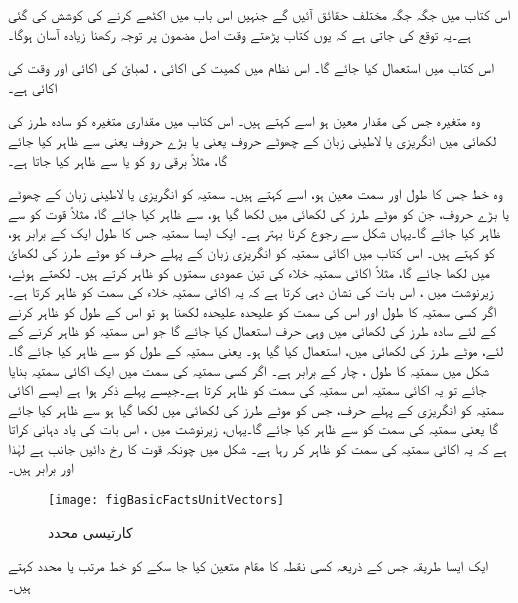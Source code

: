 اس کتاب میں جگہ جگہ مختلف حقائق آئیں گے جنہیں اس باب میں اکٹھے کرنے کی کوشش کی گئی ہے۔یہ توقع کی جاتی ہے کہ یوں کتاب پڑھتے وقت اصل مضمون پر توجہ رکھنا زیادہ آسان ہوگا۔

اس کتاب میں   استعمال کیا جائے گا۔ اس نظام میں کمیت کی اکائی ،  لمبائ کی اکائی  اور وقت کی اکائی  ہے۔

وہ متغیرہ جس کی مقدار معین ہو اسے  کہتے ہیں۔ اس کتاب میں مقداری متغیرہ کو سادہ طرز کی لکھائی میں انگریزی یا لاطینی زبان کے چھوٹے حروف  یعنی   یا بڑے حروف یعنی   سے ظاہر کیا جائے گا، مثلاً برقی رو کو  یا  سے ظاہر کیا جاتا ہے۔

	وہ خط جس کا طول اور سمت معین ہو، اسے  کہتے ہیں۔ سمتیہ کو انگریزی یا لاطینی زبان کے چھوٹے یا  بڑے حروف،  جن کو موٹے طرز کی لکھائی میں لکھا گیا ہو،  سے ظاہر کیا جائے گا، مثلاً قوت کو  سے ظاہر کیا جائے گا۔یہاں شکل   سے رجوع کرنا بہتر ہے۔ ایک ایسا سمتیہ جس کا طول ایک کے برابر ہو،  کو  کہتے ہیں۔ اس کتاب میں اکائی سمتیہ کو انگریزی زبان کے پہلے حرف کو موٹے طرز کی لکھائ میں لکھا جائے گا، مثلاً اکائی سمتیہ  خلاء کی تین عمودی سمتوں کو ظاہر کرتے ہیں۔ لکھتے ہوئے، زیرنوشت میں ، اس بات کی نشان دہی  کرتا ہے کہ یہ اکائی سمتیہ خلاء کی  سمت کو ظاہر کرتا ہے۔ اگر کسی سمتیہ  کا طول اور اس کی سمت کو علیحدہ علیحدہ لکھنا ہو تو اس کے طول کو ظاہر کرنے کے لئے سادہ طرز کی لکھائی میں وہی حرف استعمال کیا جائے گا جو اس سمتیہ کو ظاہر کرنے کے لئے، موٹے طرز کی لکھائی میں، استعمال کیا گیا ہو۔ یعنی سمتیہ  کے طول کو  سے ظاہر کیا جائے گا۔ شکل میں سمتیہ   کا طول ، چار کے برابر ہے۔ اگر کسی سمتیہ کی سمت میں ایک اکائی سمتیہ بنایا جائے تو یہ اکائی سمتیہ اس سمتیہ کی سمت کو ظاہر کرتا ہے۔جیسے پہلے ذکر ہوا ہے  ایسے اکائی سمتیہ کو انگریزی کے پہلے حرف،  جس کو موٹے طرز کی لکھائی میں لکھا گیا ہو  سے ظاہر کیا جائے گا یعنی سمتیہ  کی سمت کو  سے ظاہر کیا جائے گا۔یہاں،  زیرنوشت میں  ، اس بات کی یاد دہانی کراتا ہے کہ یہ اکائی سمتیہ  کی سمت کو ظاہر کر رہا ہے۔ شکل میں چونکہ قوت  کا رخ دائیں جانب ہے لہٰذا   اور   برابر ہیں۔
\begin{figure}
\centering
\texttt{[image: figBasicFactsUnitVectors]}
\caption{کارتیسی محدد}
\label{شکل_حقائق_اکائی_سمتیہ}
\end{figure}
%
ایک ایسا طریقہ جس کے ذریعہ کسی نقطہ کا مقام متعین کیا جا سکے کو خط مرتب یا محدد کہتے ہیں۔

